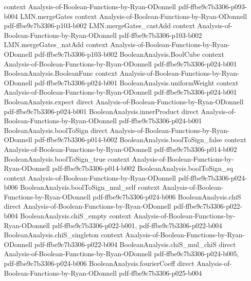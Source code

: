 \begin{theorem}
  {context}
  {Analysis-of-Boolean-Functions-by-Ryan-ODonnell}
  {pdf-ffbe9c7b3306-p093-b004}
\proofstep
  {LMN.mergeGates}
  {context}
  {Analysis-of-Boolean-Functions-by-Ryan-ODonnell}
  {pdf-ffbe9c7b3306-p103-b002}
\proofstep
  {LMN.mergeGates_castAdd}
  {context}
  {Analysis-of-Boolean-Functions-by-Ryan-ODonnell}
  {pdf-ffbe9c7b3306-p103-b002}
\proofstep
  {LMN.mergeGates_natAdd}
  {context}
  {Analysis-of-Boolean-Functions-by-Ryan-ODonnell}
  {pdf-ffbe9c7b3306-p103-b002}
\proofstep
  {BooleanAnalysis.BoolCube}
  {context}
  {Analysis-of-Boolean-Functions-by-Ryan-ODonnell}
  {pdf-ffbe9c7b3306-p024-b001}
\proofstep
  {BooleanAnalysis.BooleanFunc}
  {context}
  {Analysis-of-Boolean-Functions-by-Ryan-ODonnell}
  {pdf-ffbe9c7b3306-p024-b001}
\proofstep
  {BooleanAnalysis.uniformWeight}
  {context}
  {Analysis-of-Boolean-Functions-by-Ryan-ODonnell}
  {pdf-ffbe9c7b3306-p024-b001}
\proofstep
  {BooleanAnalysis.expect}
  {direct}
  {Analysis-of-Boolean-Functions-by-Ryan-ODonnell}
  {pdf-ffbe9c7b3306-p024-b001}
\proofstep
  {BooleanAnalysis.innerProduct}
  {direct}
  {Analysis-of-Boolean-Functions-by-Ryan-ODonnell}
  {pdf-ffbe9c7b3306-p024-b001}
\proofstep
  {BooleanAnalysis.boolToSign}
  {direct}
  {Analysis-of-Boolean-Functions-by-Ryan-ODonnell}
  {pdf-ffbe9c7b3306-p014-b002}
\proofstep
  {BooleanAnalysis.boolToSign_false}
  {context}
  {Analysis-of-Boolean-Functions-by-Ryan-ODonnell}
  {pdf-ffbe9c7b3306-p014-b002}
\proofstep
  {BooleanAnalysis.boolToSign_true}
  {context}
  {Analysis-of-Boolean-Functions-by-Ryan-ODonnell}
  {pdf-ffbe9c7b3306-p014-b002}
\proofstep
  {BooleanAnalysis.boolToSign_sq}
  {context}
  {Analysis-of-Boolean-Functions-by-Ryan-ODonnell}
  {pdf-ffbe9c7b3306-p024-b006}
\proofstep
  {BooleanAnalysis.boolToSign_mul_self}
  {context}
  {Analysis-of-Boolean-Functions-by-Ryan-ODonnell}
  {pdf-ffbe9c7b3306-p024-b006}
\proofstep
  {BooleanAnalysis.chiS}
  {direct}
  {Analysis-of-Boolean-Functions-by-Ryan-ODonnell}
  {pdf-ffbe9c7b3306-p022-b004}
\proofstep
  {BooleanAnalysis.chiS_empty}
  {context}
  {Analysis-of-Boolean-Functions-by-Ryan-ODonnell}
  {pdf-ffbe9c7b3306-p022-b001,
    pdf-ffbe9c7b3306-p022-b004}
\proofstep
  {BooleanAnalysis.chiS_singleton}
  {context}
  {Analysis-of-Boolean-Functions-by-Ryan-ODonnell}
  {pdf-ffbe9c7b3306-p022-b004}
\proofstep
  {BooleanAnalysis.chiS_mul_chiS}
  {direct}
  {Analysis-of-Boolean-Functions-by-Ryan-ODonnell}
  {pdf-ffbe9c7b3306-p024-b005,
    pdf-ffbe9c7b3306-p024-b006}
\proofstep
  {BooleanAnalysis.fourierCoeff}
  {direct}
  {Analysis-of-Boolean-Functions-by-Ryan-ODonnell}
  {pdf-ffbe9c7b3306-p025-b004}

\end{theorem}
